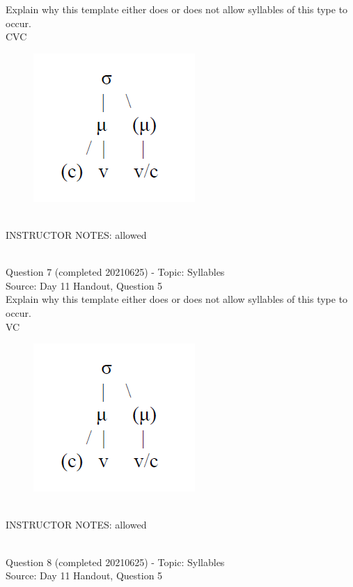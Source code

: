 \documentclass[12pt]{article}
\begin{document}
Explain why this template either does or does not allow syllables of this type to occur.\\

CVC

\begin{figure}[H]
\includegraphics{../images/ponapean_syllabletemplate.png}
\end{figure}

~\\
INSTRUCTOR NOTES: allowed


~\\

{\large Question 7} (completed 20210625) - Topic: Syllables\\
Source: Day 11 Handout, Question 5\\

Explain why this template either does or does not allow syllables of this type to occur.\\

VC

\begin{figure}[H]
\includegraphics{../images/ponapean_syllabletemplate.png}
\end{figure}

~\\
INSTRUCTOR NOTES: allowed


~\\

{\large Question 8} (completed 20210625) - Topic: Syllables\\
Source: Day 11 Handout, Question 5\\
\end{document}
